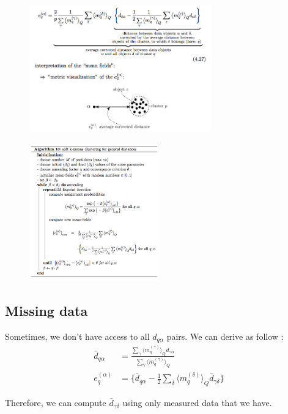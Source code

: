 \begin{figure}[hbt]
	\center
  \includegraphics[width=0.7\textwidth]{figures/cl-mean-field-formular}
  \caption{}
\end{figure}

\begin{figure}[hbt]
	\center
  \includegraphics[width=0.5\textwidth]{figures/cl-mean-softkmean-algorithm}
  \caption{}
\end{figure}

\subsection{Missing data}
Sometimes, we don't have access to all $d_{q\alpha}$ pairs. We can derive as follow : 
\begin{align*}
	\bar{d}_{q\alpha} &= \frac{\sum_\gamma \langle m_q^{(\gamma)} \rangle_Q d_{\gamma\alpha} }{ \sum_\gamma \langle m_q^{(\gamma)} \rangle_Q } \\
	e_q^{(\alpha)} &= \Bigg \{  \bar{d}_{q\alpha} - \frac{1}{2} \sum_{\delta} \langle m_q^{(\delta)} \rangle_Q  \bar{d}_{\gamma\delta}\Bigg \}
\end{align*}

Therefore, we can compute $\bar{d}_{\gamma\delta}$ using only measured data that we have.

